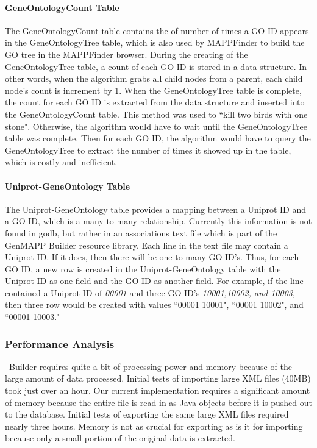 \paragraph{GeneOntologyCount Table}
The GeneOntologyCount table contains the of number of times a GO ID appears in the GeneOntologyTree table, which
is also used by MAPPFinder to build the GO tree in the MAPPFinder browser. During the creating of the GeneOntologyTree
table, a count of each GO ID is stored in a data structure. In other words, when the algorithm grabs all child nodes from
a parent, each child node's count is increment by 1. When the GeneOntologyTree table is complete, the count for
each GO ID is extracted from the data structure and inserted into the GeneOntologyCount table.
This method was used to ``kill two birds with one stone". Otherwise,
the algorithm would have to wait until the GeneOntologyTree table was complete. Then for each GO ID, the algorithm would have
to query the GeneOntologyTree to extract the number of times it showed up in the table, which is costly and inefficient.


\paragraph{Uniprot-GeneOntology Table}
The Uniprot-GeneOntology table provides a mapping between a Uniprot ID and a GO ID, which is a many to many relationship.
Currently this information is not found in godb, but rather in an associations text file which is part of the GenMAPP Builder
resource library. Each line in the text file may contain a Uniprot ID. If it does, then there will be one to many GO ID's.
Thus, for each GO ID, a new row is created in the Uniprot-GeneOntology table with the Uniprot ID as one field and the GO ID
as another field. For example, if the line contained a Uniprot ID of \emph{00001} and three GO ID's \emph{10001,10002, and 10003},
then three row would be created with values ``00001 10001", ``00001 10002", and ``00001 10003."

\subsubsection{Performance Analysis}
\genmapp~Builder requires quite a bit of processing power and memory because of the large amount of data processed.  Initial tests of importing large XML files (40MB) took just over an hour.  Our current implementation requires a significant amount of memory because the entire file is read in as Java objects before it is pushed out to the database. Initial tests of exporting the same large XML files required nearly three hours.  Memory is not as crucial for exporting as is it for importing because only a small portion of the original data is extracted.


